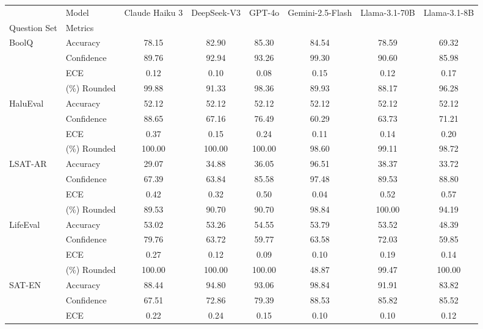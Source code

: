 \documentclass{article}
\begin{document}
\begin{appendices}
\begin{table}
    \vspace{1cm}
    
    \begin{tabular}{ll | cccccc}
    \toprule
     & Model & Claude Haiku 3 & DeepSeek-V3 & GPT-4o & Gemini-2.5-Flash & Llama-3.1-70B & Llama-3.1-8B \\
    Question Set & Metrics &  &  &  &  &  &  \\
    \midrule
    \multirow[c]{4}{*}{BoolQ} & Accuracy & 78.15 & 82.90 & 85.30 & 84.54 & 78.59 & 69.32 \\
     & Confidence & 89.76 & 92.94 & 93.26 & 99.30 & 90.60 & 85.98 \\
     & ECE & 0.12 & 0.10 & 0.08 & 0.15 & 0.12 & 0.17 \\
     & (\%) Rounded & 99.88 & 91.33 & 98.36 & 89.93 & 88.17 & 96.28 \\
    \midrule
    \multirow[c]{4}{*}{HaluEval} & Accuracy & 52.12 & 52.12 & 52.12 & 52.12 & 52.12 & 52.12 \\
     & Confidence & 88.65 & 67.16 & 76.49 & 60.29 & 63.73 & 71.21 \\
     & ECE & 0.37 & 0.15 & 0.24 & 0.11 & 0.14 & 0.20 \\
     & (\%) Rounded & 100.00 & 100.00 & 100.00 & 98.60 & 99.11 & 98.72 \\
    \midrule
    \multirow[c]{4}{*}{LSAT-AR} & Accuracy & 29.07 & 34.88 & 36.05 & 96.51 & 38.37 & 33.72 \\
     & Confidence & 67.39 & 63.84 & 85.58 & 97.48 & 89.53 & 88.80 \\
     & ECE & 0.42 & 0.32 & 0.50 & 0.04 & 0.52 & 0.57 \\
     & (\%) Rounded & 89.53 & 90.70 & 90.70 & 98.84 & 100.00 & 94.19 \\
    \midrule
    \multirow[c]{4}{*}{LifeEval} & Accuracy & 53.02 & 53.26 & 54.55 & 53.79 & 53.52 & 48.39 \\
     & Confidence & 79.76 & 63.72 & 59.77 & 63.58 & 72.03 & 59.85 \\
     & ECE & 0.27 & 0.12 & 0.09 & 0.10 & 0.19 & 0.14 \\
     & (\%) Rounded & 100.00 & 100.00 & 100.00 & 48.87 & 99.47 & 100.00 \\
    \midrule
    \multirow[c]{4}{*}{SAT-EN} & Accuracy & 88.44 & 94.80 & 93.06 & 98.84 & 91.91 & 83.82 \\
     & Confidence & 67.51 & 72.86 & 79.39 & 88.53 & 85.82 & 85.52 \\
     & ECE & 0.22 & 0.24 & 0.15 & 0.10 & 0.10 & 0.12 \\

\end{tabular}
\end{table}
\end{appendices}
\end{document}
